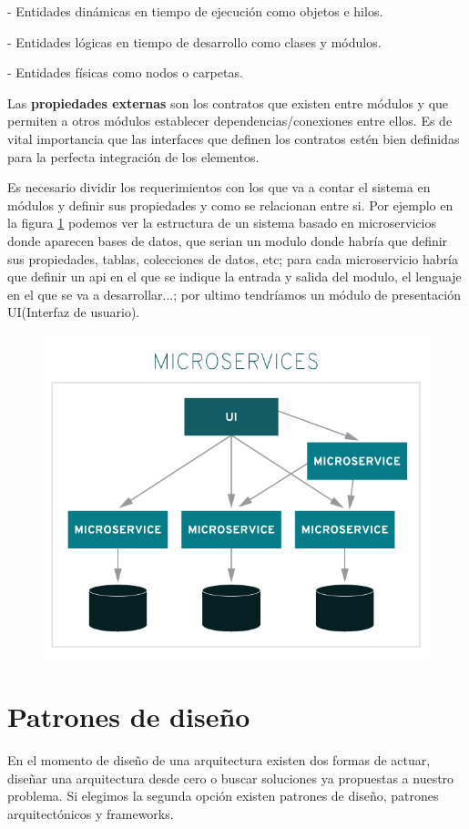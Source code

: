 \documentclass[12pt]{report} %
\begin{document}
	- Entidades dinámicas en tiempo de ejecución como objetos e hilos.
	
	- Entidades lógicas en tiempo de desarrollo como clases y módulos.
	
	- Entidades físicas como nodos o carpetas.	
	
	Las \textbf{propiedades externas} son los contratos que existen entre módulos y que permiten a otros módulos establecer dependencias/conexiones entre ellos. Es de vital importancia que las interfaces que definen los contratos estén bien definidas para la perfecta integración de los elementos.
	
	Es necesario dividir los requerimientos con los que va a contar el sistema en módulos y definir sus propiedades y como se relacionan entre si. Por ejemplo en la figura \ref{fig:microservices} podemos ver la estructura de un sistema basado en microservicios donde aparecen bases de datos, que serian un modulo donde habría que definir sus propiedades, tablas, colecciones de datos, etc; para cada microservicio habría que definir un api en el que se indique la entrada y salida del modulo, el lenguaje en el que se va a desarrollar...; por ultimo tendríamos un módulo de presentación UI(Interfaz de usuario).
	\begin{figure}
		\centering
		\includegraphics[width=0.7\linewidth]{imagenes/monolithic-vs-microservices}
		\caption{}
		\label{fig:microservices}
	\end{figure}

	\section{Patrones de diseño}
	 En el momento de diseño de una arquitectura existen dos formas de actuar, diseñar una arquitectura desde cero o buscar soluciones ya propuestas a nuestro problema. Si elegimos la segunda opción existen patrones de diseño, patrones arquitectónicos y frameworks.
	 
\end{document}
